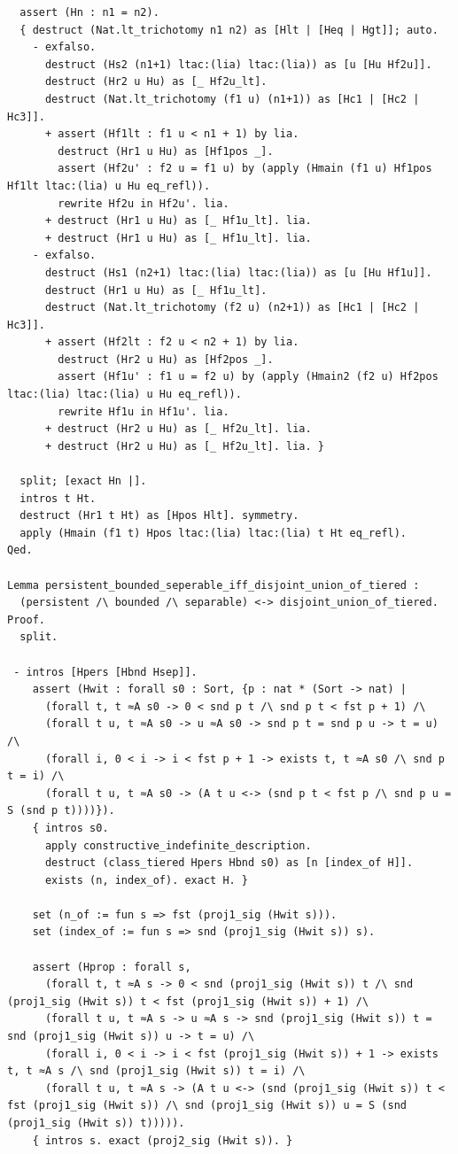 \begin{latin}
\begin{verbatim}
  assert (Hn : n1 = n2).
  { destruct (Nat.lt_trichotomy n1 n2) as [Hlt | [Heq | Hgt]]; auto.
    - exfalso.
      destruct (Hs2 (n1+1) ltac:(lia) ltac:(lia)) as [u [Hu Hf2u]].
      destruct (Hr2 u Hu) as [_ Hf2u_lt].
      destruct (Nat.lt_trichotomy (f1 u) (n1+1)) as [Hc1 | [Hc2 | Hc3]].
      + assert (Hf1lt : f1 u < n1 + 1) by lia.
        destruct (Hr1 u Hu) as [Hf1pos _].
        assert (Hf2u' : f2 u = f1 u) by (apply (Hmain (f1 u) Hf1pos Hf1lt ltac:(lia) u Hu eq_refl)).
        rewrite Hf2u in Hf2u'. lia.
      + destruct (Hr1 u Hu) as [_ Hf1u_lt]. lia.
      + destruct (Hr1 u Hu) as [_ Hf1u_lt]. lia.
    - exfalso.
      destruct (Hs1 (n2+1) ltac:(lia) ltac:(lia)) as [u [Hu Hf1u]].
      destruct (Hr1 u Hu) as [_ Hf1u_lt].
      destruct (Nat.lt_trichotomy (f2 u) (n2+1)) as [Hc1 | [Hc2 | Hc3]].
      + assert (Hf2lt : f2 u < n2 + 1) by lia.
        destruct (Hr2 u Hu) as [Hf2pos _].
        assert (Hf1u' : f1 u = f2 u) by (apply (Hmain2 (f2 u) Hf2pos ltac:(lia) ltac:(lia) u Hu eq_refl)).
        rewrite Hf1u in Hf1u'. lia.
      + destruct (Hr2 u Hu) as [_ Hf2u_lt]. lia.
      + destruct (Hr2 u Hu) as [_ Hf2u_lt]. lia. }

  split; [exact Hn |].
  intros t Ht.
  destruct (Hr1 t Ht) as [Hpos Hlt]. symmetry.
  apply (Hmain (f1 t) Hpos ltac:(lia) ltac:(lia) t Ht eq_refl).
Qed.

Lemma persistent_bounded_seperable_iff_disjoint_union_of_tiered : 
  (persistent /\ bounded /\ separable) <-> disjoint_union_of_tiered.
Proof.
  split.

 - intros [Hpers [Hbnd Hsep]].
    assert (Hwit : forall s0 : Sort, {p : nat * (Sort -> nat) |
      (forall t, t ≈A s0 -> 0 < snd p t /\ snd p t < fst p + 1) /\
      (forall t u, t ≈A s0 -> u ≈A s0 -> snd p t = snd p u -> t = u) /\
      (forall i, 0 < i -> i < fst p + 1 -> exists t, t ≈A s0 /\ snd p t = i) /\
      (forall t u, t ≈A s0 -> (A t u <-> (snd p t < fst p /\ snd p u = S (snd p t))))}).
    { intros s0.
      apply constructive_indefinite_description.
      destruct (class_tiered Hpers Hbnd s0) as [n [index_of H]].
      exists (n, index_of). exact H. }

    set (n_of := fun s => fst (proj1_sig (Hwit s))).
    set (index_of := fun s => snd (proj1_sig (Hwit s)) s).

    assert (Hprop : forall s, 
      (forall t, t ≈A s -> 0 < snd (proj1_sig (Hwit s)) t /\ snd (proj1_sig (Hwit s)) t < fst (proj1_sig (Hwit s)) + 1) /\
      (forall t u, t ≈A s -> u ≈A s -> snd (proj1_sig (Hwit s)) t = snd (proj1_sig (Hwit s)) u -> t = u) /\
      (forall i, 0 < i -> i < fst (proj1_sig (Hwit s)) + 1 -> exists t, t ≈A s /\ snd (proj1_sig (Hwit s)) t = i) /\
      (forall t u, t ≈A s -> (A t u <-> (snd (proj1_sig (Hwit s)) t < fst (proj1_sig (Hwit s)) /\ snd (proj1_sig (Hwit s)) u = S (snd (proj1_sig (Hwit s)) t))))).
    { intros s. exact (proj2_sig (Hwit s)). }


\end{verbatim}
\end{latin}
